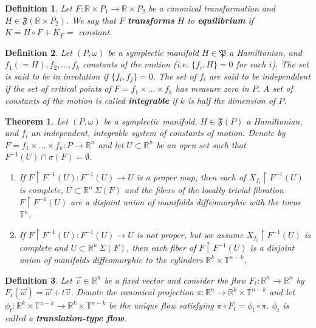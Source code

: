\documentclass{article}
\newtheorem{thm}{Theorem}
\newtheorem{defn}{Definition}
\begin{document}
\begin{defn}
    Let $F: \mathbb{R} \times P_1 \to \mathbb{R} \times P_2$ be a canonical transformation and $H \in \mathfrak{F}(\mathbb{R} \times P_2)$. We say that $F$ \textbf{transforms} $H$ to \textbf{equilibrium} if $K = H \circ F + K_F =$ constant.
\end{defn}


\begin{defn}
    Let $(P,\omega)$ be a symplectic manifold $H \in \mathfrak{P}$ a Hamiltonian, and $f_1 (=H), f_2, \ldots, f_k$ constants of the motion (i.e. $\{f_i,H\}=0$ for each $i$). The set is said to be in involution if $\{f_i,f_j\} = 0$. The set of $f_i$ are said to be independdent if the set of critical points of $F = f_1 \times \ldots \times f_k$ has measure zero in $P$. A set of constants of the motion is called \textbf{integrable} if $k$ is half the dimension of $P$.
\end{defn}



\begin{thm}
    Let $(P,\omega)$ be a symplectic manifold, $H \in \mathfrak{F}(P)$ a Hamiltonian, and $f_i$ an independent, integrable system of constants of motion. Denote by $F = f_1 \times \ldots \times f_k: P \to \mathbb{R}^n$ and let $U \subset \mathbb{R}^n$ be an open set such that $F^{-1}(U) \cap \sigma(F) = \emptyset$.
    \begin{enumerate}
        \item If $F \restriction F^{-1}(U): F^{-1}(U) \to U$ is a proper map, then each of $X_{f_i} \restriction F^{-1}(U)$ is complete, $U \subset \mathbb{R}^n \ \Sigma(F)$ and the fibers of the locally trivial fibration $F \restriction F^{-1}(U)$ are a disjoint union of manifolds diffeomorphic with the torus $\mathbb{T}^n$.
        \item If $F \restriction F^{-1}(U): F^{-1}(U) \to U$ is not proper, but we assume $X_{f_i} \restriction F^{-1}(U)$ is complete and $U \subset \mathbb{R}^n \ \Sigma(F)$, then each fiber of $F \restriction F^{-1}(U)$ is a disjoint union of manifolds diffeomorphic to the cylinders $\mathbb{R}^k \times \mathbb{T}^{n-k}$.
    \end{enumerate}

\end{thm}

\begin{defn}

    Let $\vec{v} \in \mathbb{R}^n$ be a fixed vector and consider the flow $F_t: \mathbb{R}^n \to \mathbb{R}^n$ by $F_t(\vec{w}) = \vec{w} + t \vec{v}$. Denote the canonical projection $\pi: \mathbb{R}^n \to \mathbb{R}^k \times \mathbb{T}^{n-k}$ and let $\phi_t: \mathbb{R}^k \times \mathbb{T}^{n-k} \to \mathbb{R}^k \times \mathbb{T}^{n-k}$ be the unique flow satisfying $\pi \circ F_t = \phi_t \circ \pi$. $\phi_t$ is called a \textbf{translation-type flow}.
\end{defn}
\end{document}
